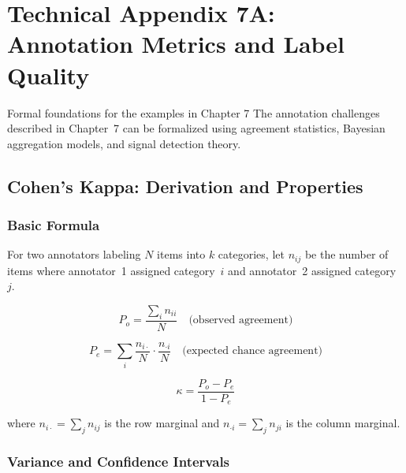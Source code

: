 
\chapter*{Technical Appendix 7A: Annotation Metrics and Label Quality}

\begin{chapterquote}{Formal foundations for the examples in Chapter 7}
The annotation challenges described in Chapter~7 can be formalized using agreement statistics, Bayesian aggregation models, and signal detection theory.
\end{chapterquote}

\apxnumon
\section{Cohen's Kappa: Derivation and Properties}

\subsection{Basic Formula}

For two annotators labeling $N$ items into $k$ categories, let $n_{ij}$ be the number of items where annotator~1 assigned category~$i$ and annotator~2 assigned category~$j$.

\[
P_o = \frac{\sum_i n_{ii}}{N} \quad \text{(observed agreement)}
\]

\[
P_e = \sum_i \frac{n_{i\cdot}}{N} \cdot \frac{n_{\cdot i}}{N} \quad \text{(expected chance agreement)}
\]

\[
\kappa = \frac{P_o - P_e}{1 - P_e}
\]

where $n_{i\cdot} = \sum_j n_{ij}$ is the row marginal and $n_{\cdot i} = \sum_j n_{ji}$ is the column marginal.

\subsection{Variance and Confidence Intervals}

